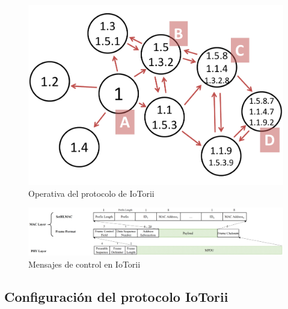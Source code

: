 \begin{figure}[ht!]
    \centering
    \includegraphics[width=\textwidth]{archivos/img/analisis/iotorii-operation.pdf}
    \caption{Operativa del protocolo de IoTorii \cite{rojas2021outperforming}}
    \label{fig:iotorii-operation}
\end{figure}



\begin{figure}
    \centering
    \includegraphics[width=\textwidth]{archivos/img/analisis/Comparation_frame_iotorii.eps}
    \caption{Mensajes de control en IoTorii \cite{rojas2021outperforming}}
    \label{fig:frameformat-setHLMAC}
\end{figure}


\subsection{Configuración del protocolo IoTorii}